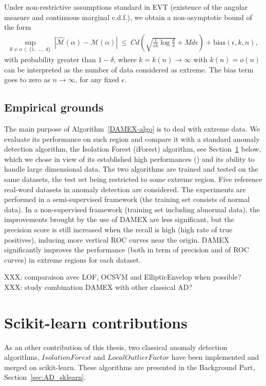 Under non-restrictive assumptions standard in EVT (existence of the angular measure and continuous marginal c.d.f.), we obtain a non-asymptotic bound of the form
\begin{align*}
\sup_{\emptyset \neq \alpha \subset \{1,\; \ldots,\; d \}}~ |\widehat{\mathcal{M}}(\alpha)- \mathcal{M}(\alpha)|
~\le~  C d \left( \sqrt{ \frac{1}{\epsilon k}\log\frac{d}{\delta}} + M d\epsilon \right) + \text{bias}(\epsilon, k, n),
\end{align*}
with probability greater than $1-\delta$, where $k = k(n) \to \infty$ with $k(n) = o(n)$ can be interpreted as the number of data considered as extreme. 
The bias term goes to zero as $n \to \infty$, for any fixed $\epsilon$.




\subsection{Empirical grounds}
 The main purpose of Algorithm~\ref{DAMEX-algo} is to deal with extreme data. We evaluate its performance on such region and compare it with a standard anomaly detection algorithm, the Isolation Forest (iForest) algorithm, see Section~\ref{sec:impl} below, which we chose in view of its established high performances (\cite{Liu2008}) and its ability to handle large dimensional data. 
The two algorithms are trained and tested on the same datasets, the test set being restricted to some extreme region.
Five reference real-word datasets in anomaly detection are considered. The experiments are performed in a semi-supervised framework (the training set consists of normal data). In a  non-supervised framework (training set including abnormal data), the improvements brought by the use of DAMEX are less significant, but the precision score is still increased when the recall is high (high rate of true positives), inducing more vertical ROC curves near the origin.
DAMEX significantly improves the performance (both in term of precision and of ROC curves) in extreme regions for each dataset.

XXX: comparaison avec LOF, OCSVM and EllipticEnvelop when possible?\\
XXX: study combination DAMEX with other classical AD?

\section{Scikit-learn contributions}
\label{sec:impl}

As an other contribution of this thesis, two classical anomaly detection algorithms, $IsolationForest$ and $LocalOutlierFactor$ have been implemented and merged on scikit-learn. These algorithms are presented in the Background Part, Section~\ref{sec:AD_sklearn}. %

